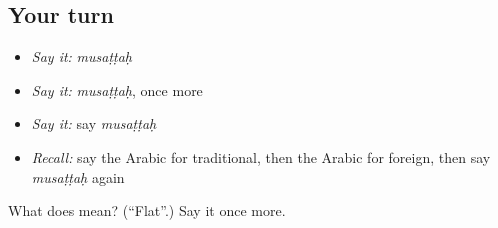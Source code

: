 \subsection*{Your turn}
\begin{itemize}
\raggedright
  \item \emph{Say it:} \emph{musaṭṭaḥ}
  \item \emph{Say it:} \emph{musaṭṭaḥ}, once more
  \item \emph{Say it:} say \emph{musaṭṭaḥ}
  \item \emph{Recall:} say the Arabic for traditional, then the Arabic for foreign, then say \emph{musaṭṭaḥ} again
\end{itemize}

\begin{tcolorbox}[breakable,colback=teal!4,colframe=teal!35!black,title={Before you move on}]
What does  mean? (\textquotedblleft{}Flat\textquotedblright{}.) Say it once more.
\end{tcolorbox}
